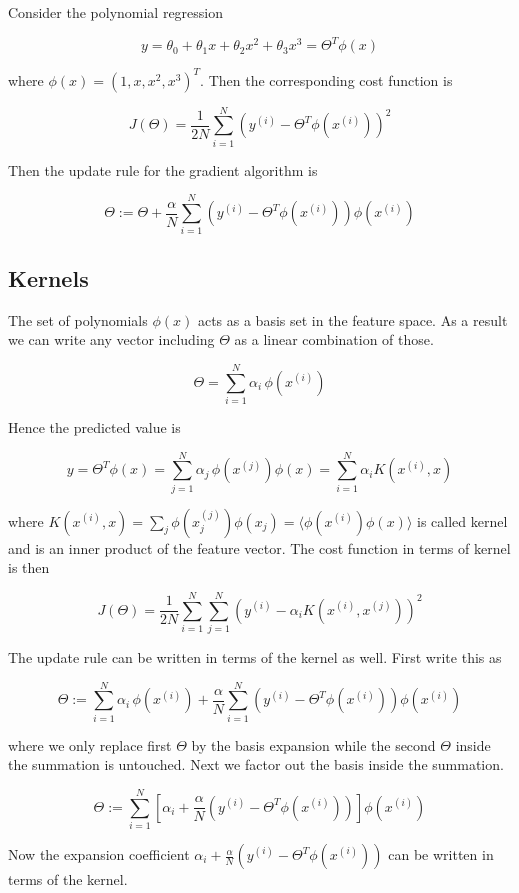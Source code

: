 \documentclass[11pt]{article}
\theoremstyle{definition}
\begin{document}
Consider the polynomial regression 

$$
y = \theta_0 + \theta_1 x + \theta_2 x^2 + \theta_3 x^3 = \Theta^T\phi(x)
$$

where $\phi(x) = (1, x, x^2, x^3)^T$.  Then the corresponding cost function is 

$$
J(\Theta) = \frac{1}{2N} \sum_{i=1}^N \left(y^{(i)} - \Theta^T\phi(x^{(i)})\right)^2
$$

Then the update rule for the gradient algorithm is 

$$
\Theta := \Theta + \frac{\alpha}{N} \sum_{i=1}^N \left(y^{(i)} - \Theta^T\phi(x^{(i)})\right)\phi(x^{(i)})
$$


\subsection{Kernels }



The set of polynomials $\phi(x)$ acts as a basis set in the feature space. As a result we can write any vector including $\Theta$ as a linear combination of those. 


$$
\Theta = \sum_{i=1}^N \alpha_i \, \phi(x^{(i)})
$$


Hence the predicted value is  

$$
y = \Theta^T \phi(x) = \sum_{j=1}^N \alpha_j \, \phi(x^{(j)})\phi(x) = \sum_{i=1}^N \alpha_i K(x^{(i)}, x)
$$


where $K(x^{(i)}, x) = \sum_j \phi(x_j^{(j)})\phi(x_j)= \langle \phi(x^{(i)})\phi(x) \rangle$ is called kernel and is an inner product of the feature vector.  The cost function in terms of kernel is then 


$$
J(\Theta) = \frac{1}{2N} \sum_{i=1}^N \sum_{j=1}^N \left(y^{(i)} - \alpha_i K(x^{(i)}, x^{(j)})\right)^2
$$


The update rule can be written in terms of the kernel as well. First write this as 

$$
\Theta := \sum_{i=1}^N \alpha_i \, \phi(x^{(i)}) + \frac{\alpha}{N} \sum_{i=1}^N \left(y^{(i)} - \Theta^T\phi(x^{(i)})\right)\phi(x^{(i)})
$$

where we only replace first $\Theta$ by the basis expansion while the second $\Theta$ inside the summation is untouched. Next we factor out the basis inside the summation. 

$$
\Theta := \sum_{i=1}^N \left[\alpha_i + \frac{\alpha}{N} \left(y^{(i)} - \Theta^T\phi(x^{(i)})\right)\right]\phi(x^{(i)})
$$


Now the expansion coefficient $\alpha_i + \frac{\alpha}{N} \left(y^{(i)} - \Theta^T\phi(x^{(i)})\right)$ can be written in terms of the kernel. 
\end{document}
